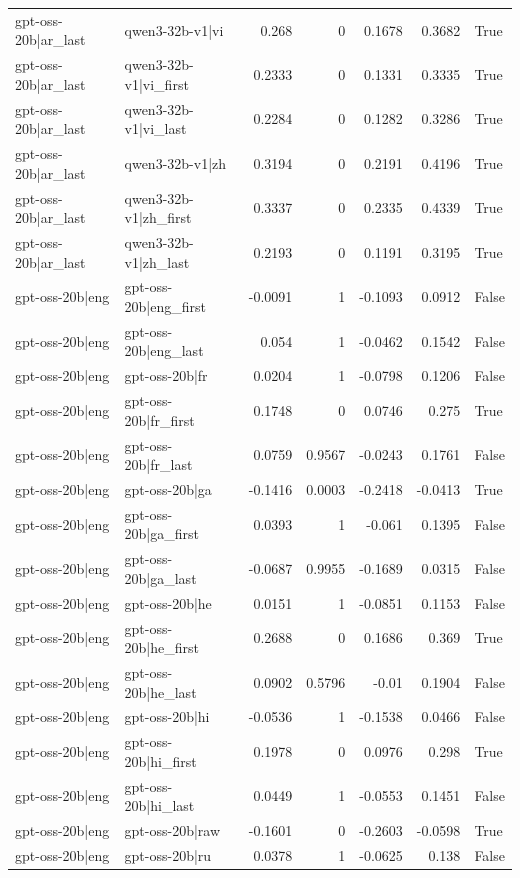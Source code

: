 \begin{table}
\begin{tabular}{l l r r r r l}
gpt-oss-20b|ar_last & qwen3-32b-v1|vi & 0.268 & 0 & 0.1678 & 0.3682 & True \\
gpt-oss-20b|ar_last & qwen3-32b-v1|vi_first & 0.2333 & 0 & 0.1331 & 0.3335 & True \\
gpt-oss-20b|ar_last & qwen3-32b-v1|vi_last & 0.2284 & 0 & 0.1282 & 0.3286 & True \\
gpt-oss-20b|ar_last & qwen3-32b-v1|zh & 0.3194 & 0 & 0.2191 & 0.4196 & True \\
gpt-oss-20b|ar_last & qwen3-32b-v1|zh_first & 0.3337 & 0 & 0.2335 & 0.4339 & True \\
gpt-oss-20b|ar_last & qwen3-32b-v1|zh_last & 0.2193 & 0 & 0.1191 & 0.3195 & True \\
gpt-oss-20b|eng & gpt-oss-20b|eng_first & -0.0091 & 1 & -0.1093 & 0.0912 & False \\
gpt-oss-20b|eng & gpt-oss-20b|eng_last & 0.054 & 1 & -0.0462 & 0.1542 & False \\
gpt-oss-20b|eng & gpt-oss-20b|fr & 0.0204 & 1 & -0.0798 & 0.1206 & False \\
gpt-oss-20b|eng & gpt-oss-20b|fr_first & 0.1748 & 0 & 0.0746 & 0.275 & True \\
gpt-oss-20b|eng & gpt-oss-20b|fr_last & 0.0759 & 0.9567 & -0.0243 & 0.1761 & False \\
gpt-oss-20b|eng & gpt-oss-20b|ga & -0.1416 & 0.0003 & -0.2418 & -0.0413 & True \\
gpt-oss-20b|eng & gpt-oss-20b|ga_first & 0.0393 & 1 & -0.061 & 0.1395 & False \\
gpt-oss-20b|eng & gpt-oss-20b|ga_last & -0.0687 & 0.9955 & -0.1689 & 0.0315 & False \\
gpt-oss-20b|eng & gpt-oss-20b|he & 0.0151 & 1 & -0.0851 & 0.1153 & False \\
gpt-oss-20b|eng & gpt-oss-20b|he_first & 0.2688 & 0 & 0.1686 & 0.369 & True \\
gpt-oss-20b|eng & gpt-oss-20b|he_last & 0.0902 & 0.5796 & -0.01 & 0.1904 & False \\
gpt-oss-20b|eng & gpt-oss-20b|hi & -0.0536 & 1 & -0.1538 & 0.0466 & False \\
gpt-oss-20b|eng & gpt-oss-20b|hi_first & 0.1978 & 0 & 0.0976 & 0.298 & True \\
gpt-oss-20b|eng & gpt-oss-20b|hi_last & 0.0449 & 1 & -0.0553 & 0.1451 & False \\
gpt-oss-20b|eng & gpt-oss-20b|raw & -0.1601 & 0 & -0.2603 & -0.0598 & True \\
gpt-oss-20b|eng & gpt-oss-20b|ru & 0.0378 & 1 & -0.0625 & 0.138 & False \\

\end{tabular}
\end{table}
